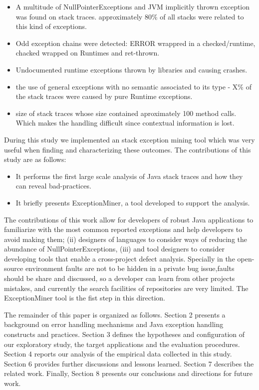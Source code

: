 \documentclass[conference]{IEEEtran}
\begin{document}
\begin{itemize}
\item  A multitude of NullPointerExceptions and JVM implicitly thrown exception was found on stack traces. approximately 80\% of all stacks were related to this kind of exceptions.
\item Odd exception chains were detected: ERROR  wrappred in a checked/runtime, chacked wrapped on Runtimes and ret-thrown.
 \item  Undocumented runtime exceptions thrown by  libraries and causing crashes.
\item the use of general exceptions with no semantic associated to its type - X\% of the stack traces were caused by pure Runtime exceptions.
\item  size of stack traces whose size contained aproximately 100 method calls. Which makes the handling difficult since contextual information is lost.
\end{itemize}

During this study we implemented an stack exception mining tool which was very useful when finding and characterizing these outcomes. The contributions of this study are as follows:
\begin{itemize}
\item  It performs the first large scale analysis of Java stack traces and how they can reveal bad-practices. 
\item  It briefly presents ExceptionMiner, a tool developed to support the analysis.
\end{itemize}

The contributions of this work allow for developers of robust Java applications to familiarize with the most common reported exceptions and help developers to avoid making them; (ii) designers of  languages to consider ways of reducing the abundance of NullPointerExceptions, (iii) and tool designers to consider developing tools that enable a cross-project defect analysis. Specially in the open-source environment faults are not to be hidden in a private bug issue,faults should be share and discussed, so a developer can learn from other projects mistakes, and currently the search facilities of repositories are very limited. The ExceptionMiner tool is the fist step in this direction.

The remainder of this paper is organized as follows. Section 2 presents a background on error handling mechanisms and Java exception handling constructs and practices. Section 3 defines the hypotheses and configuration of our exploratory study, the target applications and the evaluation procedures. Section 4 reports our analysis of the empirical data collected in this study. Section 6 provides further discussions and lessons learned. Section 7 describes the related work. Finally, Section 8 presents our conclusions and directions for future work. 
\end{document}

